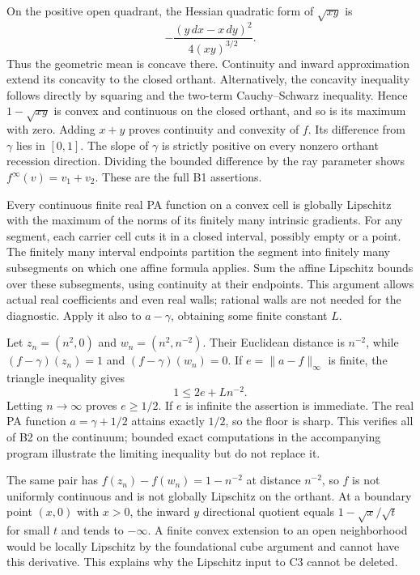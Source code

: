 \documentclass[
  11pt,
]{article}
\begin{document}
On the positive open quadrant, the Hessian quadratic form of
\(\sqrt{xy}\) is \[ -\frac{(y\,dx-x\,dy)^2}{4(xy)^{3/2}}. \] Thus the
geometric mean is concave there. Continuity and inward approximation
extend its concavity to the closed orthant. Alternatively, the concavity
inequality follows directly by squaring and the two-term Cauchy--Schwarz
inequality. Hence \(1-\sqrt{xy}\) is convex and continuous on the closed
orthant, and so is its maximum with zero. Adding \(x+y\) proves
continuity and convexity of \(f\). Its difference from \(\gamma\) lies
in \([0,1]\). The slope of \(\gamma\) is strictly positive on every
nonzero orthant recession direction. Dividing the bounded difference by
the ray parameter shows \(f^\infty(v)=v_1+v_2\). These are the full B1
assertions.

Every continuous finite real PA function on a convex cell is globally
Lipschitz with the maximum of the norms of its finitely many intrinsic
gradients. For any segment, each carrier cell cuts it in a closed
interval, possibly empty or a point. The finitely many interval
endpoints partition the segment into finitely many subsegments on which
one affine formula applies. Sum the affine Lipschitz bounds over these
subsegments, using continuity at their endpoints. This argument allows
actual real coefficients and even real walls; rational walls are not
needed for the diagnostic. Apply it also to \(a-\gamma\), obtaining some
finite constant \(L\).

Let \(z_n=(n^2,0)\) and \(w_n=(n^2,n^{-2})\). Their Euclidean distance
is \(n^{-2}\), while \((f-\gamma)(z_n)=1\) and \((f-\gamma)(w_n)=0\). If
\(e=\|a-f\|_\infty\) is finite, the triangle inequality gives
\[ 1\leq2e+L n^{-2}. \] Letting \(n\to\infty\) proves \(e\geq1/2\). If
\(e\) is infinite the assertion is immediate. The real PA function
\(a=\gamma+1/2\) attains exactly \(1/2\), so the floor is sharp. This
verifies all of B2 on the continuum; bounded exact computations in the
accompanying program illustrate the limiting inequality but do not
replace it.

The same pair has \(f(z_n)-f(w_n)=1-n^{-2}\) at distance \(n^{-2}\), so
\(f\) is not uniformly continuous and is not globally Lipschitz on the
orthant. At a boundary point \((x,0)\) with \(x>0\), the inward \(y\)
directional quotient equals \(1-\sqrt{x}/\sqrt t\) for small \(t\) and
tends to \(-\infty\). A finite convex extension to an open neighborhood
would be locally Lipschitz by the foundational cube argument and cannot
have this derivative. This explains why the Lipschitz input to C3 cannot
be deleted.
\end{document}
